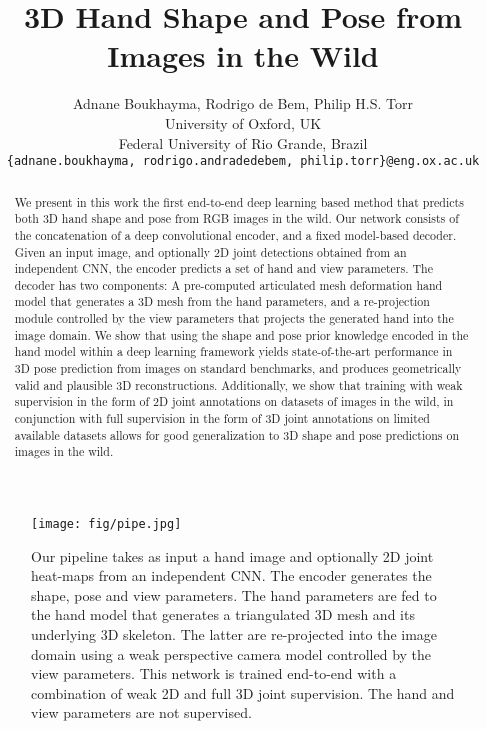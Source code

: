\documentclass[10pt,twocolumn,letterpaper]{article}
\begin{document}
\title{3D Hand Shape and Pose from Images in the Wild}

\author{Adnane Boukhayma, Rodrigo de Bem, Philip H.S. Torr\\
 University of Oxford, UK\\
 Federal University of Rio Grande, Brazil\\
{\tt\small \{adnane.boukhayma, rodrigo.andradedebem, philip.torr\}@eng.ox.ac.uk}
}




\maketitle


\begin{abstract}
   We present in this work the first end-to-end deep learning based method that predicts both 3D hand shape and pose from RGB images in the wild. Our network consists of the concatenation of a deep convolutional encoder, and a fixed model-based decoder. Given an input image, and optionally 2D joint detections obtained from an independent CNN, the encoder predicts a set of hand and view parameters. The decoder has two components: A pre-computed articulated mesh deformation hand model that generates a 3D mesh from the hand parameters, and a re-projection module controlled by the view parameters that projects the generated hand into the image domain. We show that using the shape and pose prior knowledge encoded in the hand model within a deep learning framework yields state-of-the-art performance in 3D pose prediction from images on standard benchmarks, and produces geometrically valid and plausible 3D reconstructions.
Additionally, we show that training with weak supervision in the form of 2D joint annotations on datasets of images in the wild, in conjunction with full supervision in the form of 3D joint annotations on limited available datasets allows for good generalization to 3D shape and pose predictions on images in the wild.      
\end{abstract}

\begin{figure*}[t!]
\center
\texttt{[image: fig/pipe.jpg]}
\vspace{-5pt}
\caption{Our pipeline takes as input a hand image and optionally 2D joint heat-maps from an independent CNN. The encoder generates the shape, pose and view parameters. The hand parameters are fed to the hand model that generates a triangulated 3D mesh and its underlying 3D skeleton. The latter are re-projected into the image domain using a weak perspective camera model controlled by the view parameters. This network is trained end-to-end with a combination of weak 2D and full 3D joint supervision. The hand and view parameters are not supervised.}
\label{fig:pipe}
\end{figure*}
\end{document}
